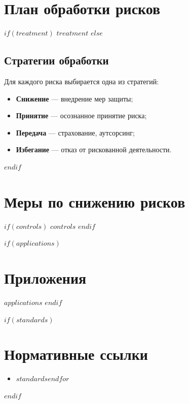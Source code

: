 \documentclass[14pt,a4paper]{extarticle}
\begin{document}
\section{План обработки рисков}
\label{sec:treatment}

$if(treatment)$
$treatment$
$else$
\subsection{Стратегии обработки}
Для каждого риска выбирается одна из стратегий:
\begin{itemize}
    \item \textbf{Снижение} — внедрение мер защиты;
    \item \textbf{Принятие} — осознанное принятие риска;
    \item \textbf{Передача} — страхование, аутсорсинг;
    \item \textbf{Избегание} — отказ от рискованной деятельности.
\end{itemize}
$endif$

\section{Меры по снижению рисков}
\label{sec:controls}

$if(controls)$
$controls$
$endif$

$if(applications)$
\newpage
\appendix
\section*{Приложения}
$applications$
$endif$

$if(standards)$
\newpage
\section*{Нормативные ссылки}
\begin{itemize}
$for(standards)$\item $standards$$endfor$
\end{itemize}
$endif$
\end{document}
